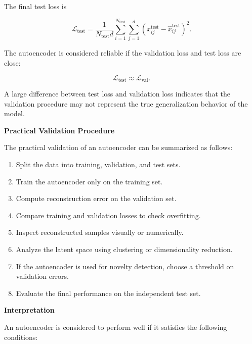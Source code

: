 \documentclass{book}
\providecommand{\ProjectDeepHeading}[2]{%
    \par\medskip\noindent\textbf{#2}\par\smallskip
}
\begin{document}
        The final test loss is
        
        \[
            \mathcal{L}_{\mathrm{test}}
            =
            \frac{1}{N_{\mathrm{test}}d}
            \sum_{i=1}^{N_{\mathrm{test}}}
            \sum_{j=1}^{d}
            (x_{ij}^{\mathrm{test}}-\hat{x}_{ij}^{\mathrm{test}})^2.
        \]
        
        The autoencoder is considered reliable if the validation loss and test loss are close:
        
        \[
            \mathcal{L}_{\mathrm{test}}
            \approx
            \mathcal{L}_{\mathrm{val}}.
        \]
        
        A large difference between test loss and validation loss indicates that the validation procedure may not represent the true generalization behavior of the model.
    
    
    \ProjectDeepHeading{4}{Practical Validation Procedure}
        
        The practical validation of an autoencoder can be summarized as follows:
        
        \begin{enumerate}
            \item Split the data into training, validation, and test sets.
            \item Train the autoencoder only on the training set.
            \item Compute reconstruction error on the validation set.
            \item Compare training and validation losses to check overfitting.
            \item Inspect reconstructed samples visually or numerically.
            \item Analyze the latent space using clustering or dimensionality reduction.
            \item If the autoencoder is used for novelty detection, choose a threshold on validation errors.
            \item Evaluate the final performance on the independent test set.
        \end{enumerate}
    
    
    \ProjectDeepHeading{4}{Interpretation}
        
        An autoencoder is considered to perform well if it satisfies the following conditions:
        
\end{document}
